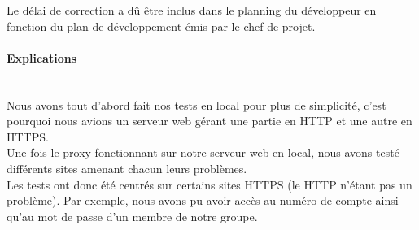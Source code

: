   Le délai de correction a dû être inclus dans le planning du développeur en fonction
  du plan de développement émis par le chef de projet.
  
\paragraph{Explications}~~\\

Nous avons tout d'abord fait nos tests en local pour plus de simplicité, c'est pourquoi nous avions un serveur web gérant une partie en HTTP et une autre en HTTPS.~~\\

Une fois le proxy fonctionnant sur notre serveur web en local, nous avons testé différents sites amenant chacun leurs problèmes.~~\\

Les tests ont donc été centrés sur certains sites HTTPS (le HTTP n'étant pas un problème).
Par exemple, nous avons pu avoir accès au numéro de compte ainsi qu'au mot de passe d'un membre de notre groupe.
